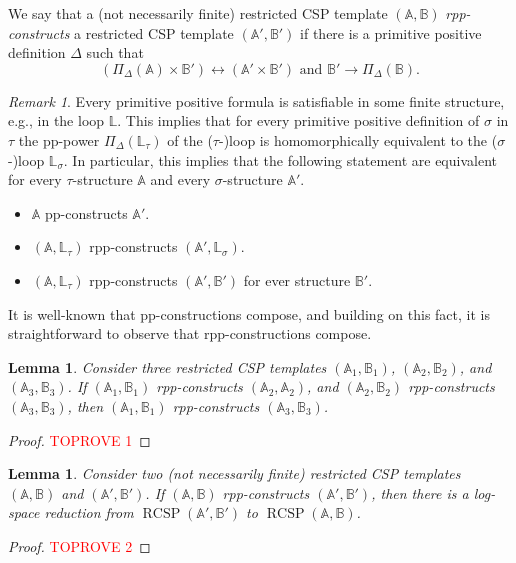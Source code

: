 \documentclass{article}
\newtheorem{lemma}[theorem]{Lemma}
\theoremstyle{definition}
\theoremstyle{remark}
\newtheorem{remark}[theorem]{Remark}
\DeclareMathOperator{\RCSP}{RCSP}
\newcommand{\bA}{{\mathbb A}}
\newcommand{\bB}{{\mathbb B}}
\newcommand{\bL}{{\mathbb L}}
\begin{document}
We say that a (not necessarily finite) restricted CSP template
$(\bA,\bB)$ \emph{rpp-constructs} a restricted CSP template $(\bA',\bB')$ if
there is a primitive positive definition $\Delta$  such that
\[
(\Pi_\Delta(\bA) \times \bB') \leftrightarrow  (\bA' \times \bB') \text{ and } \bB'\to \Pi_\Delta(\bB).
\]

\begin{remark}\label{rmk:pp-and-rpp}
    Every primitive positive formula is satisfiable in some finite structure, e.g., in the loop $\bL$. 
    This implies that for every primitive positive definition of $\sigma$ in $\tau$ the
    pp-power $\Pi_\Delta(\bL_\tau)$ of the ($\tau$-)loop is homomorphically equivalent to the
    ($\sigma$-)loop $\bL_\sigma$.  In particular, this implies that the following statement are
    equivalent for every $\tau$-structure $\bA$ and every $\sigma$-structure $\bA'$.
    \begin{itemize}
        \item $\bA$ pp-constructs $\bA'$.
        \item $(\bA,\bL_\tau)$ rpp-constructs $(\bA',\bL_\sigma)$.
        \item $(\bA,\bL_\tau)$ rpp-constructs $(\bA',\bB')$ for ever structure $\bB'$.
    \end{itemize}
\end{remark}


It is well-known that pp-constructions compose, and building on this fact, it is
straightforward to observe that rpp-constructions compose. 

\begin{lemma}\label{lem:rpp-compose}
    Consider three restricted CSP templates $(\bA_1,\bB_1)$, $(\bA_2,\bB_2)$, 
    and $(\bA_3,\bB_3)$. If $(\bA_1,\bB_1)$ rpp-constructs $(\bA_2,\bA_2)$, 
    and $(\bA_2,\bB_2)$ rpp-constructs $(\bA_3,\bB_3)$, then $(\bA_1,\bB_1)$ 
    rpp-constructs $(\bA_3,\bB_3)$. 
\end{lemma}
\begin{proof}\textcolor{red}{TOPROVE 1}\end{proof}

 

\begin{lemma}\label{lem:rpp-constructions}
    Consider two (not necessarily finite) restricted CSP templates $(\bA,\bB)$ and
    $(\bA',\bB')$. If $(\bA,\bB)$ rpp-constructs $(\bA',\bB')$, then there is a log-space
    reduction from $\RCSP(\bA',\bB')$ to $\RCSP(\bA,\bB)$.
\end{lemma}
\begin{proof}\textcolor{red}{TOPROVE 2}\end{proof}
\end{document}
